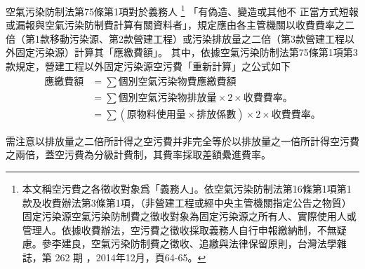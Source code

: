 空氣污染防制法第75條第1項對於義務人
\footnote{本文稱空污費之各徵收對象爲「義務人」。依空氣污染防制法第16條第1項第1款及收費辦法第3條第1項，（非營建工程或經中央主管機關指定公告之物質）固定污染源空氣污染防制費之徵收對象為固定污染源之所有人、實際使用人或管理人。依據收費辦法，空污費之徵收採取義務人自行申報繳納制，不無疑慮。參李建良，空氣污染防制費之徵收、追繳與法律保留原則，台灣法學雜誌，第 262 期 ，2014年12月，頁64-65。}
「有偽造、變造或其他不
正當方式短報或漏報與空氣污染防制費計算有關資料者」，規定應由各主管機關以收費費率之二倍（第1款移動污染源、第2款營建工程）或污染排放量之二倍（第3款營建工程以外固定污染源）計算其「應繳費額」。
其中，依據空氣污染防制法第75條第1項第3款規定，營建工程以外固定污染源空污費「重新計算」之公式如下
\begin{equation*}
\begin{aligned}
   \text{應繳費額}&=\sum \text{個別空氣污染物費應繳費額}\\
   &=\sum\text{個別空氣污染物排放量}\times 2 \times \text{收費費率。}\\
   &=\sum\left(\text{原物料使用量}\times\text{排放係數}\right)\times 2 \times
   \text{收費費率。}
\end{aligned}
\end{equation*}

需注意以排放量之二倍所計得之空污費并非完全等於以排放量之一倍所計得空污費之兩倍，蓋空污費為分級計費制，其費率採取差額纍進費率。



